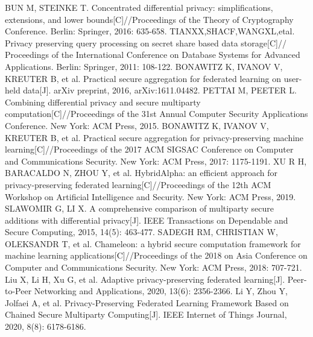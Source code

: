 \documentclass[12pt,openany,a4paper,fancyhdr,oneside]{ctexbook}
\begin{document}
\begin{thebibliography}{99}
BUN M, STEINKE T. Concentrated differential privacy: simplifications, extensions, and lower bounds[C]//Proceedings of the Theory of Cryptography Conference. Berlin: Springer, 2016: 635-658.
TIANXX,SHACF,WANGXL,etal. Privacy preserving query processing on secret share based data storage[C]// Proceedings of the International Conference on Database Systems for Advanced Applications. Berlin: Springer, 2011: 108-122.
BONAWITZ K, IVANOV V, KREUTER B, et al. Practical secure aggregation for federated learning on user-held data[J]. arXiv preprint, 2016, arXiv:1611.04482.
PETTAI M, PEETER L. Combining differential privacy and secure multiparty computation[C]//Proceedings of the 31st Annual Computer Security Applications Conference. New York: ACM Press, 2015.
BONAWITZ K, IVANOV V, KREUTER B, et al. Practical secure aggregation for privacy-preserving machine learning[C]//Proceedings of the 2017 ACM SIGSAC Conference on Computer and Communications Security. New York: ACM Press, 2017: 1175-1191.
XU R H, BARACALDO N, ZHOU Y, et al. HybridAlpha: an efficient approach for privacy-preserving federated learning[C]//Proceedings of the 12th ACM Workshop on Artificial Intelligence and Security. New York: ACM Press, 2019.
SLAWOMIR G, LI X. A comprehensive comparison of multiparty secure additions with differential privacy[J]. IEEE Transactions on Dependable and Secure Computing, 2015, 14(5): 463-477.
SADEGH RM, CHRISTIAN W, OLEKSANDR T, et al. Chameleon: a hybrid secure computation framework for machine learning applications[C]//Proceedings of the 2018 on Asia Conference on Computer and Communications Security. New York: ACM Press, 2018: 707-721.
Liu X, Li H, Xu G, et al. Adaptive privacy-preserving federated learning[J]. Peer-to-Peer Networking and Applications, 2020, 13(6): 2356-2366.
Li Y, Zhou Y, Jolfaei A, et al. Privacy-Preserving Federated Learning Framework Based on Chained Secure Multiparty Computing[J]. IEEE Internet of Things Journal, 2020, 8(8): 6178-6186.


\end{thebibliography}

\pagestyle{plain}
\clearpage
{}
{}


\pagestyle{plain}
\clearpage
{}
{}



\printindex
\end{document}
